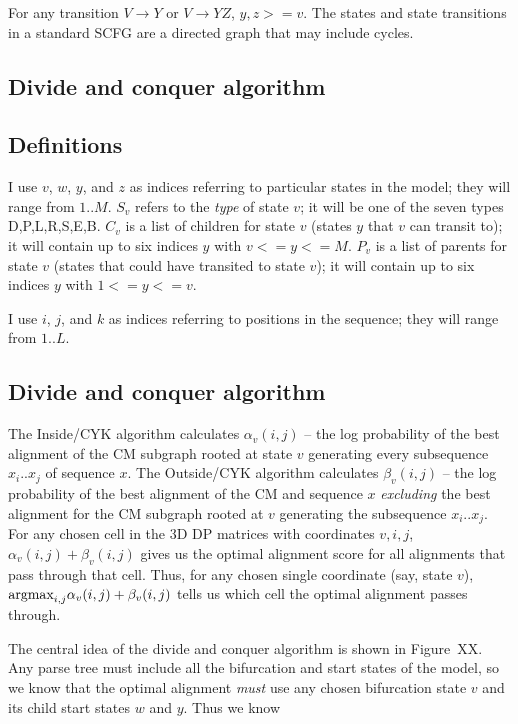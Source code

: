 \documentclass[11pt]{article}
\begin{document}
For any transition $V \rightarrow Y$ or $V \rightarrow YZ$, $y,z >=
v$. The states and state transitions in a standard SCFG are a directed
graph that may include cycles. 

\subsection{Divide and conquer algorithm}

\subsection{Definitions}

I use $v$, $w$, $y$, and $z$ as indices referring to particular states
in the model; they will range from $1..M$. $S_v$ refers to the
\emph{type} of state $v$; it will be one of the seven types
{D,P,L,R,S,E,B}. $C_v$ is a list of children for state $v$ (states $y$
that $v$ can transit to); it will contain up to six indices $y$ with
$v <= y <= M$. $P_v$ is a list of parents for state $v$ (states that
could have transited to state $v$); it will contain up to six indices
$y$ with $1 <= y <= v$.

I use $i$, $j$, and $k$ as indices referring to positions in the
sequence; they will range from $1..L$.

\subsection{Divide and conquer algorithm}

The Inside/CYK algorithm calculates $\alpha_v(i,j)$ -- the log
probability of the best alignment of the CM subgraph rooted at state
$v$ generating every subsequence $x_i..x_j$ of sequence $x$.  The
Outside/CYK algorithm calculates $\beta_v(i,j)$ -- the log probability
of the best alignment of the CM and sequence $x$
\emph{excluding} the best alignment for the CM subgraph rooted at
$v$ generating the subsequence $x_i..x_j$.  For any chosen cell in the
3D DP matrices with coordinates $v,i,j$, $\alpha_v(i,j) +
\beta_v(i,j)$ gives us the optimal alignment score for all alignments
that pass through that cell. Thus, for any chosen single coordinate
(say, state $v$), $\mbox{\rm{argmax}}_{i,j} \alpha_{v}(i,j) +
\beta_{v}(i,j)$ tells us which cell the optimal alignment
passes through.

The central idea of the divide and conquer algorithm is shown in
Figure~XX. Any parse tree must include all the bifurcation and start
states of the model, so we know that the optimal alignment \emph{must}
use any chosen bifurcation state $v$ and its child start states $w$
and $y$. Thus we know
\end{document}
